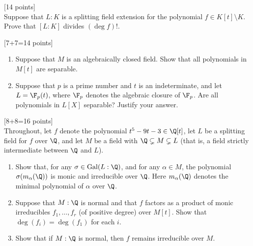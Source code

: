 \documentclass{article}
\begin{document}
 \hfill [14 points] \\
Suppose that \( L : K \) is a splitting field extension for the polynomial \( f \in K[t] \setminus K \). Prove that \( [L : K] \) divides \( (\deg f)! \).
\pagebreak

 \hfill [7+7=14 points]
\begin{enumerate}[label=(\alph*)]
  \item Suppose that \( M \) is an algebraically closed field. Show that all polynomials in \( M[t] \) are separable.
    \pagebreak
  \item Suppose that \( p \) is a prime number and \( t \) is an indeterminate, and let \( L = \F_p(t) \), where \( \F_p \) denotes the algebraic closure of \( \F_p \). Are all polynomials in \( L[X] \) separable? Justify your answer.
\end{enumerate}
\pagebreak

 \hfill [8+8=16 points] \\
Throughout, let \( f \) denote the polynomial \( t^5 - 9t - 3 \in \Q[t] \), let \( L \) be a splitting field for \( f \) over \( \Q \), and let \( M \) be a field with \( \Q \subsetneq M \subsetneq L \) (that is, a field strictly intermediate between \( \Q \) and \( L \)).
\begin{enumerate}[label=(\alph*)]
  \item Show that, for any \( \sigma \in \mathrm{Gal}(L : \Q) \), and for any \( \alpha \in M \), the polynomial \( \sigma(m_\alpha(\Q)) \) is monic and irreducible over \( \Q \). Here \( m_\alpha(\Q) \) denotes the minimal polynomial of \( \alpha \) over \( \Q \).
    \pagebreak
  \item Suppose that \( M : \Q \) is normal and that \( f \) factors as a product of monic irreducibles \( f_1, \dots, f_r \) (of positive degree) over \( M[t] \). Show that \( \deg(f_i) = \deg(f_1) \) for each \( i \).
    \pagebreak
  \item Show that if \( M : \Q \) is normal, then \( f \) remains irreducible over \( M \).
\end{enumerate}
\end{document}
